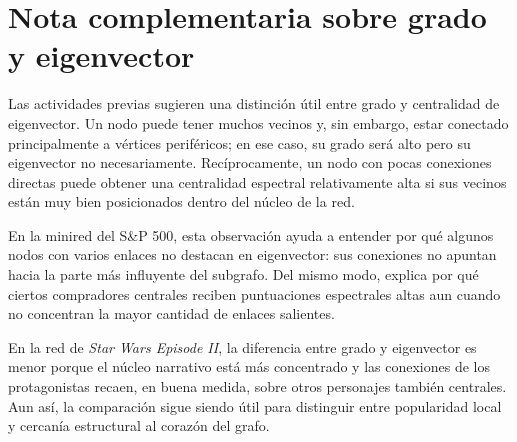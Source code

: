 \section{Nota complementaria sobre grado y eigenvector}

Las actividades previas sugieren una distinción útil entre grado y centralidad de eigenvector. Un nodo puede tener muchos vecinos y, sin embargo, estar conectado principalmente a vértices periféricos; en ese caso, su grado será alto pero su eigenvector no necesariamente. Recíprocamente, un nodo con pocas conexiones directas puede obtener una centralidad espectral relativamente alta si sus vecinos están muy bien posicionados dentro del núcleo de la red.

En la minired del S\&P 500, esta observación ayuda a entender por qué algunos nodos con varios enlaces no destacan en eigenvector: sus conexiones no apuntan hacia la parte más influyente del subgrafo. Del mismo modo, explica por qué ciertos compradores centrales reciben puntuaciones espectrales altas aun cuando no concentran la mayor cantidad de enlaces salientes.

En la red de \textit{Star Wars Episode II}, la diferencia entre grado y eigenvector es menor porque el núcleo narrativo está más concentrado y las conexiones de los protagonistas recaen, en buena medida, sobre otros personajes también centrales. Aun así, la comparación sigue siendo útil para distinguir entre popularidad local y cercanía estructural al corazón del grafo.
